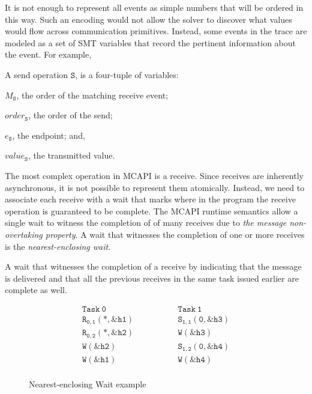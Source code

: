 It is not enough to represent all events as simple numbers
that will be ordered in this way.  Such an encoding would not allow the solver to
discover what values would flow across communication primitives. Instead, some events in the trace are modeled as a set of SMT
variables that record the pertinent information about the event. For
example,

\begin{definition}[Send] \label{def:snd}
A send operation $\mathtt{S}$, is a four-tuple of variables:
\begin{compactenum}
\item $M_\mathtt{S}$, the order of the matching receive event;

\item $\mathit{order}_\mathtt{S}$, the order of the send;

\item $e_\mathtt{S}$, the endpoint; and,

\item $\mathit{value}_\mathtt{S}$, the transmitted value.
\end{compactenum}
\end{definition}

The most complex operation in MCAPI is a receive. Since receives are
inherently asynchronous, it is not possible to represent them
atomically. Instead, we need to associate each receive with a wait
that marks where in the program the receive operation is guaranteed to be
complete. The MCAPI runtime semantics allow a single wait to witness the completion of of many receives due to \emph{the message
  non-overtaking property}. A wait that witnesses the completion of
one or more receives is the \emph{nearest-enclosing wait}.

\begin{definition} \label{def:nw}
A wait that witnesses the completion of a receive by indicating that
the message is delivered and that all the previous receives in the
same task issued earlier are complete as well.
\end{definition}

\begin{figure}[h]
\[
\begin{array}{l|l}
\;\;\;\;\;\;\;\;\mathtt{Task\ 0}\;\;\;\;\;\;\;\; & \;\;\;\;\;\;\;\; \mathtt{Task\ 1}\;\;\;\;\;\;\;\; \\
\hline
\;\;\;\;\;\;\;\;\mathtt{R_{0,1}(*,\&h1)}\;\;\;\;\;\;\;\; & \;\;\;\;\;\;\;\; \mathtt{S_{1,1}(0,\&h3)}\;\;\;\;\;\;\;\; \\
\;\;\;\;\;\;\;\;\mathtt{R_{0,2}(*,\&h2)}\;\;\;\;\;\;\;\; & \;\;\;\;\;\;\;\; \mathtt{W{(\&h3)}}\;\;\;\;\;\;\;\; \\
\;\;\;\;\;\;\;\;\mathtt{W{(\&h2)}}\;\;\;\;\;\;\;\; & \;\;\;\;\;\;\;\; \mathtt{S_{1,2}(0,\&h4)}\;\;\;\;\;\;\;\; \\
\;\;\;\;\;\;\;\;\mathtt{W{(\&h1)}}\;\;\;\;\;\;\;\; & \;\;\;\;\;\;\;\; \mathtt{W{(\&h4)}}\;\;\;\;\;\;\;\; \\
\end{array}
\]
\caption{Nearest-enclosing Wait example} \label{fig:nw}
\end{figure}

